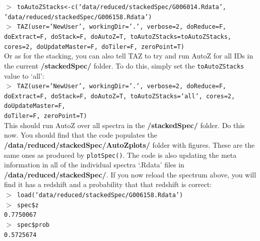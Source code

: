 \documentclass[12pt]{article}
\begin{document}
 \hspace{10mm} \texttt{$>$ toAutoZStacks<-c(`data/reduced/stackedSpec/G006014.Rdata',  \\ 'data/reduced/stackedSpec/G006158.Rdata')}\\
 
 \hspace{10mm} \texttt{$>$ TAZ(user='NewUser', workingDir='.', verbose=2, doReduce=F, doExtract=F, doStack=F,  doAutoZ=T, toAutoZStacks=toAutoZStacks, cores=2, doUpdateMaster=F, doTiler=F, zeroPoint=T)}\\ 
 
Or as for the stacking, you can also tell TAZ to try and run AutoZ for all IDs in the current \textbf{/stackedSpec/} folder. To do this, simply set the \texttt{toAutoZStacks} value to `all': \\
  

  \hspace{10mm} \texttt{$>$ TAZ(user='NewUser', workingDir='.', verbose=2, doReduce=F, doExtract=F, doStack=F, doAutoZ=T,  toAutoZStacks=`all',  cores=2, doUpdateMaster=F, \\ doTiler=F, zeroPoint=T)}\\  
  
This should run AutoZ over all spectra in the \textbf{/stackedSpec/} folder. Do this now. You should find that the code populates the \textbf{/data/reduced/stackedSpec/AutoZplots/} folder with figures. These are the same ones as produced by \texttt{plotSpec()}. The code is also updating the meta information in all of the individual spectra `.Rdata' files in \textbf{/data/reduced/stackedSpec/}. If you now reload the spectrum above, you will find it has a redshift and a probability that that redshift is correct:\\  

\hspace{10mm} \texttt{$>$ load(`data/reduced/stackedSpec/G006158.Rdata')} \\

\hspace{10mm} \texttt{$>$ spec\$z} \\

\hspace{10mm} \texttt{0.7750067}\\
 
 \hspace{10mm} \texttt{$>$ spec\$prob} \\
 
 \hspace{10mm} \texttt{0.5725674}\\
\end{document}
